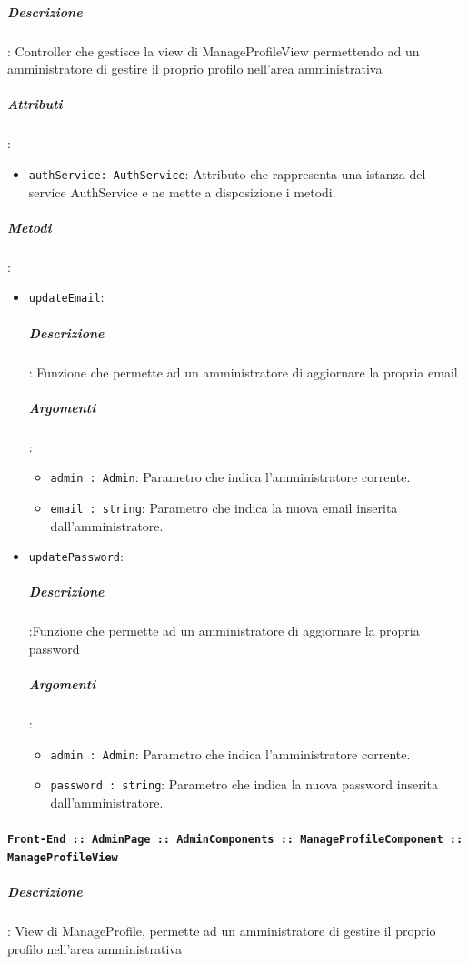 \documentclass[../DefinizioneDiProdotto_v3.0.0.tex]{subfiles}
\begin{document}
					\subparagraph{Descrizione}: Controller che gestisce la view di ManageProfileView permettendo ad un amministratore di gestire il proprio profilo nell'area amministrativa
					\subparagraph{Attributi}:
					\begin{itemize}
						\item \texttt{authService: AuthService}: Attributo che rappresenta una istanza del service AuthService e ne mette a disposizione i metodi.
					\end{itemize}
					\subparagraph{Metodi}:
					\begin{itemize}
						\item \texttt{updateEmail}:
						\subparagraph{Descrizione}: Funzione che permette ad un amministratore di aggiornare la propria email
						\subparagraph{Argomenti}:
						\begin{itemize}
							\item \texttt{admin : Admin}: Parametro che indica l'amministratore corrente.
							\item \texttt{email : string}: Parametro che indica la nuova email inserita dall'amministratore.
						\end{itemize}
						\item \texttt{updatePassword}:
						\subparagraph{Descrizione}:Funzione che permette ad un amministratore di aggiornare la propria password
						\subparagraph{Argomenti}:
						\begin{itemize}
							\item \texttt{admin : Admin}: Parametro che indica l'amministratore corrente.
							\item \texttt{password : string}: Parametro che indica la nuova password inserita dall'amministratore.
						\end{itemize}
					\end{itemize}\vspace{0.5em}
				\paragraph{\texttt{Front-End :: AdminPage :: AdminComponents :: ManageProfileComponent :: ManageProfileView}}

					\subparagraph{Descrizione}: View di ManageProfile, permette ad un amministratore di gestire il proprio profilo nell'area amministrativa


	\newpage
\end{document}
